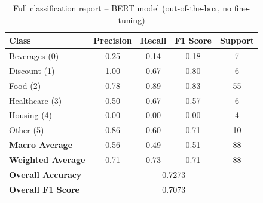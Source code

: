 \documentclass{SGGW-thesis-EN}
\begin{document}
\begin{table}[h]
  \centering
  \caption{Full classification report – BERT model (out-of-the-box, no fine-tuning)}
  \label{appendix:bert-report-outofbox}
  \begin{tabularx}{\textwidth}{lcccc}
    \toprule
    \textbf{Class} & \textbf{Precision} & \textbf{Recall} & \textbf{F1 Score} & \textbf{Support} \\
    \midrule
    Beverages (0)     & 0.25 & 0.14 & 0.18 & 7 \\
    Discount (1)      & 1.00 & 0.67 & 0.80 & 6 \\
    Food (2)          & 0.78 & 0.89 & 0.83 & 55 \\
    Healthcare (3)    & 0.50 & 0.67 & 0.57 & 6 \\
    Housing (4)       & 0.00 & 0.00 & 0.00 & 4 \\
    Other (5)         & 0.86 & 0.60 & 0.71 & 10 \\
    \midrule
    \textbf{Macro Average}   & 0.56 & 0.49 & 0.51 & 88 \\
    \textbf{Weighted Average}& 0.71 & 0.73 & 0.71 & 88 \\
    \textbf{Overall Accuracy}& \multicolumn{4}{c}{0.7273} \\
    \textbf{Overall F1 Score}& \multicolumn{4}{c}{0.7073} \\
    \bottomrule
  \end{tabularx}
\end{table}

\printbibliography

\beforelastpage
\end{document}
